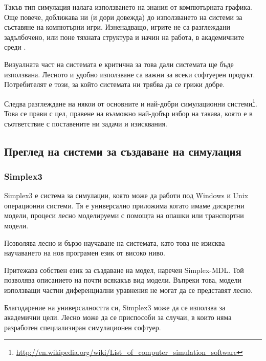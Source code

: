 		Такъв тип симулация налага използването на знания от компютърната графика. 
		Още повече, доближава ни (и дори довежда) до използването на системи за съставяне на компютърни игри. 
		Изненадващо, игрите не са разглеждани задълбочено, или поне тяхната структура и начин на работа, 
		в академичните среди \cite{Holzkorn}.
		
		Визуалната част на системата е критична за това дали системата ще бъде използвана.
		Лесното и удобно използване са важни за всеки софтуерен продукт. 
		Потребителят е този, за който системата ни трябва да се грижи добре. \cite{Microsoft}
		
		Следва разглеждане на някои от основните и най-добри симулационни 
		системи\footnote{\url{http://en.wikipedia.org/wiki/List_of_computer_simulation_software}}.
		Това се прави с цел, правене на възможно най-добър избор на такава, която е в съответствие
		с поставените ни задачи и изисквания. 
	
	\subsection{Преглед на системи за създаване на симулация}
	
		\subsubsection{Simplex3}
		
			Simplex3 е система за симулации, която може да работи под Windows и Unix операционни системи.
			Тя е универсално приложима когато имаме дискретни модели, процеси 
			лесно моделируеми с помощта на опашки или транспортни модели.
			
 
				Позволява лесно и бързо научаване на системата, като това не изисква
				научаването на нов програмен език от високо ниво.			

				
				Притежава собствен език за създаване на модел, наречен Simplex-MDL. 
				Той позволява описанието на почти всякакъв вид модели. Въпреки това,
				модели използващи частни диференциални уравнения не могат да се представят
				лесно.
			
			
				Благодарение на универсалността си, Simplex3 може да се използва за академични цели.
				Лесно може да се приспособи за случаи, в които няма разработен специализиран симулационен
				софтуер. 
			
